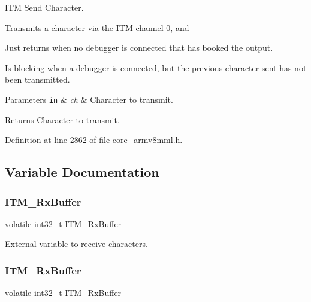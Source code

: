 I\+TM Send Character. 

Transmits a character via the I\+TM channel 0, and \begin{DoxyItemize}
\item Just returns when no debugger is connected that has booked the output. \item Is blocking when a debugger is connected, but the previous character sent has not been transmitted. 
\begin{DoxyParams}[1]{Parameters}
\mbox{\tt in}  & {\em ch} & Character to transmit. \\
\hline
\end{DoxyParams}
\begin{DoxyReturn}{Returns}
Character to transmit. 
\end{DoxyReturn}
\end{DoxyItemize}


Definition at line 2862 of file core\+\_\+armv8mml.\+h.



\subsection{Variable Documentation}
\mbox{\label{group___c_m_s_i_s__core___debug_functions_ga12e68e55a7badc271b948d6c7230b2a8}} 
\subsubsection{\texorpdfstring{I\+T\+M\+\_\+\+Rx\+Buffer}{ITM\_RxBuffer}\hspace{0.1cm}{\footnotesize\ttfamily [1/7]}}
{\footnotesize\ttfamily volatile int32\+\_\+t I\+T\+M\+\_\+\+Rx\+Buffer}

External variable to receive characters. \mbox{\label{group___c_m_s_i_s__core___debug_functions_ga12e68e55a7badc271b948d6c7230b2a8}} 
\subsubsection{\texorpdfstring{I\+T\+M\+\_\+\+Rx\+Buffer}{ITM\_RxBuffer}\hspace{0.1cm}{\footnotesize\ttfamily [2/7]}}
{\footnotesize\ttfamily volatile int32\+\_\+t I\+T\+M\+\_\+\+Rx\+Buffer}

